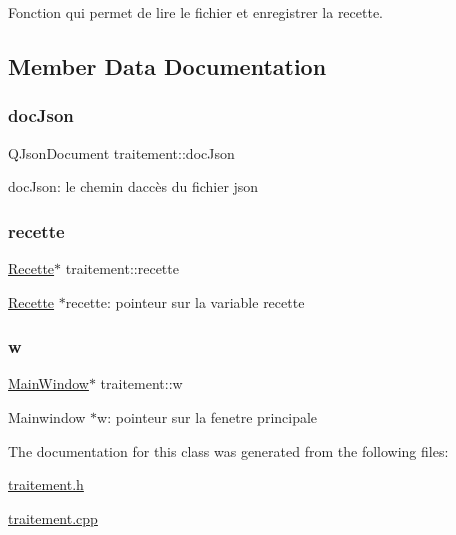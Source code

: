 Fonction qui permet de lire le fichier et enregistrer la recette. 



\subsection{Member Data Documentation}
\mbox{\label{classtraitement_a106b236f1bc787e5c64145c587f8c541}} 
\subsubsection{\texorpdfstring{doc\+Json}{docJson}}
{\footnotesize\ttfamily Q\+Json\+Document traitement\+::doc\+Json\hspace{0.3cm}{\ttfamily [private]}}

doc\+Json\+: le chemin d\textquotesingle{}accès du fichier json \mbox{\label{classtraitement_a5cf1eecd93636a2d98963125b35b1f64}} 
\subsubsection{\texorpdfstring{recette}{recette}}
{\footnotesize\ttfamily \hyperlink{classRecette}{Recette}$\ast$ traitement\+::recette\hspace{0.3cm}{\ttfamily [private]}}

\hyperlink{classRecette}{Recette} $\ast$recette\+: pointeur sur la variable recette \mbox{\label{classtraitement_a02be510f3a7838494b6d3531f8accfbd}} 
\subsubsection{\texorpdfstring{w}{w}}
{\footnotesize\ttfamily \hyperlink{classMainWindow}{Main\+Window}$\ast$ traitement\+::w\hspace{0.3cm}{\ttfamily [private]}}

Mainwindow $\ast$w\+: pointeur sur la fenetre principale 

The documentation for this class was generated from the following files\+:\begin{DoxyCompactItemize}
\item 
\hyperlink{traitement_8h}{traitement.\+h}\item 
\hyperlink{traitement_8cpp}{traitement.\+cpp}\end{DoxyCompactItemize}
